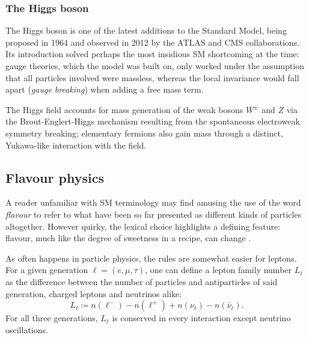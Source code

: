 \subsubsection{The Higgs boson} 
The Higgs boson is one of the latest additions to the Standard Model, being proposed in 1964 \cite{higgs1964} and observed in 2012 by the ATLAS \cite{atlasHiggs} and CMS \cite{cmsHiggs} collaborations.
Its introduction solved perhaps the most insidious SM shortcoming at the time: gauge theories, which the model was built on, only worked under the assumption that all particles involved were massless, whereas the local invariance would fall apart (\textit{gauge breaking}) when adding a free mass term.

The Higgs field accounts for mass generation of the weak bosons $W^\pm$ and $Z$ via the Brout-Englert-Higgs mechanism resulting from the spontaneous electroweak symmetry breaking;
elementary fermions also gain mass through a distinct, Yukawa-like interaction with the field.

\subsection{Flavour physics} \label{sec:flavour-physics}
A reader unfamiliar with SM terminology may find amusing the use of the word \textit{flavour} to refer to what have been so far presented as different kinds of particles altogether.
However quirky, the lexical choice highlights a defining feature: flavour, much like the degree of sweetness in a recipe, can change \cite{flavour}.

As often happens in particle physics, the rules are somewhat easier for leptons. For a given generation $\ell = (e,\mu,\tau)$, one can define a lepton family number $L_\ell$ as the difference between the number of particles and antiparticles of said generation, charged leptons and neutrinos alike:
\begin{equation}
L_\ell
\coloneqq
n(\ell^-) - n(\ell^+)
+
n(\nu_\ell) - n(\bar{\nu}_\ell).
\end{equation}
For all three generations, $L_\ell$ is conserved in every interaction except neutrino oscillations.

